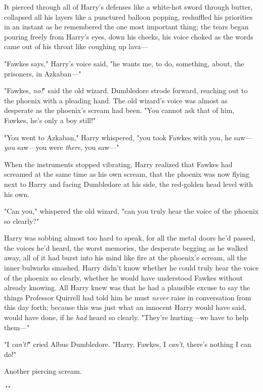It pierced through all of Harry's defenses like a white-hot sword through
butter, collapsed all his layers like a punctured balloon popping, reshuffled
his priorities in an instant as he remembered the one most important thing; the
tears began pouring freely from Harry's eyes, down his cheeks, his voice choked
as the words came out of his throat like coughing up lava\mbox{---}

"Fawkes says," Harry's voice said, "he wants me, to do, something, about, the
prisoners, in Azkaban\mbox{---}"

"Fawkes, \emph{no!}" said the old wizard. Dumbledore strode forward, reaching
out to the phoenix with a pleading hand. The old wizard's voice was almost as
desperate as the phoenix's scream had been. "You cannot ask that of him,
Fawkes, he's only a boy still!"

"You went to Azkaban," Harry whispered, "you took Fawkes with you, he
saw---\emph{you} saw---you were \emph{there}, you saw---\emph{}"

When the instruments stopped vibrating, Harry realized that Fawkes had screamed
at the same time as his own scream, that the phoenix was now flying next to
Harry and facing Dumbledore at his side, the red-golden head level with his own.

"Can you," whispered the old wizard, "can you truly hear the voice of the
phoenix so clearly?"

Harry was sobbing almost too hard to speak, for all the metal doors he'd
passed, the voices he'd heard, the worst memories, the desperate begging as he
walked away, all of it had burst into his mind like fire at the phoenix's
scream, all the inner bulwarks smashed. Harry didn't know whether he could
truly hear the voice of the phoenix so clearly, whether he would have
understood Fawkes without already knowing. All Harry knew was that he had a
plausible excuse to say the things Professor Quirrell had told him he must
\emph{never} raise in conversation from this day forth; because this was just
what an innocent Harry would have said, would have done, if he \emph{had} heard
so clearly. "They're hurting---we have to help them\mbox{---}"

"I \emph{can't!}" cried Albus Dumbledore. "Harry, Fawkes, I \emph{can't},
there's nothing I can do!"

Another piercing scream.

\emph{""}

